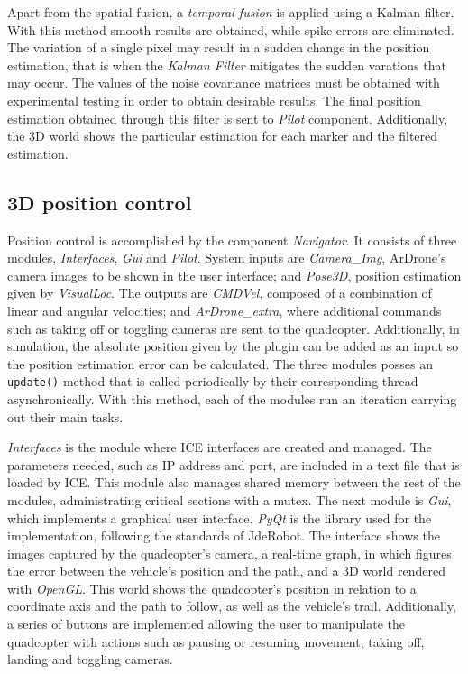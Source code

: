 \documentclass{styles/svproc}
\begin{document}
        Apart from the spatial fusion, a \textit{temporal fusion} is applied using a Kalman filter. With this method smooth results are obtained, while spike errors are eliminated. The variation of a single pixel may result in a sudden change in the position estimation, that is when the \textit{Kalman Filter} mitigates the sudden varations that may occur. The values of the noise covariance matrices must be obtained with experimental testing in order to obtain desirable results. The final position estimation obtained through this filter is sent to \textit{Pilot} component. Additionally, the 3D world shows the particular estimation for each marker and the filtered estimation.
	
\subsection{3D position control}

	Position control is accomplished by the component \textit{Navigator}. It consists of three modules, \textit{Interfaces}, \textit{Gui} and \textit{Pilot}. System inputs are \textit{Camera\_Img}, ArDrone's camera images to be shown in the user interface; and \textit{Pose3D}, position estimation given by \textit{VisualLoc}. The outputs are \textit{CMDVel}, composed of a combination of linear and angular velocities; and \textit{ArDrone\_extra}, where additional commands such as taking off or toggling cameras are sent to the quadcopter. Additionally, in simulation, the absolute position given by the plugin can be added as an input so the position estimation error can be calculated. The three modules posses an \texttt{update()} method that is called periodically by their corresponding thread asynchronically. With this method, each of the modules run an iteration carrying out their main tasks.
	
	\textit{Interfaces} is the module where ICE interfaces are created and managed. The parameters needed, such as IP address and port, are included in a text file that is loaded by ICE. This module also manages shared memory between the rest of the modules, administrating critical sections with a mutex. The next module is \textit{Gui}, which implements a graphical user interface. \textit{PyQt} is the library used for the implementation, following the standards of JdeRobot. The interface shows the images captured by the quadcopter's camera, a real-time graph, in which figures the error between the vehicle's position and the path, and a 3D world rendered with \textit{OpenGL}. This world shows the quadcopter's position in relation to a coordinate axis and the path to follow, as well as the vehicle's trail. Additionally, a series of buttons are implemented allowing the user to manipulate the quadcopter with actions such as pausing or resuming movement, taking off, landing and toggling cameras.
	
\end{document}
